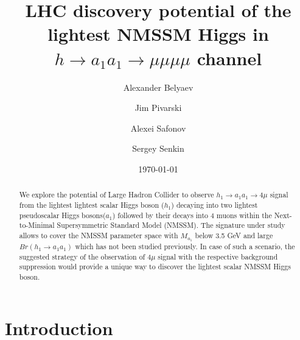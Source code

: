 \documentclass[aps,prl,twocolumn,nofootinbib,superscriptaddress]{revtex4}
\begin{document}
\title
{LHC discovery potential 
of the lightest NMSSM Higgs in $h \to a_1 a_1 \to \mu \mu \mu \mu$
channel}

\author{Alexander Belyaev}
\author{Jim Pivarski}
\author{Alexei Safonov}
\author{Sergey Senkin}


\date{\today}


\begin{abstract}
We explore the potential of Large Hadron Collider to observe  $h_1\to
a_1a_1\to 4\mu$ signal from the lightest lightest scalar Higgs boson
($h_1$) decaying into two  lightest pseudoscalar Higgs bosons($a_1$) 
followed by their decays into 4 muons within the Next-to-Minimal
Supersymmetric Standard Model (NMSSM).
The signature under study allows to cover the  NMSSM parameter space
with  $M_{a_1}$ below 3.5 GeV and large $Br(h_1\to a_1 a_1)$ 
which has not been studied previously. In case of  such a scenario,
the suggested strategy of the observation of 
$4\mu$ signal with the respective background suppression
would provide a unique way to discover
the lightest scalar NMSSM Higgs boson.
\end{abstract}


\maketitle
\section{Introduction}
\end{document}
